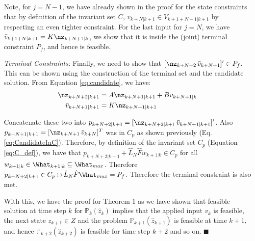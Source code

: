 Note,  for $j=N-1$, we have already shown in the proof for the state constraints that by definition of the invariant set $C$, $v_{k+N|k+1} \in {V}_{k+1+N-1|k+1}$ by respecting an even tighter constraint.
For the last input for $j=N$, we have $\bar{v}_{k+1+N|k+1}=K\nz_{k+N+1|k}$, we show that it is inside the (joint) terminal constraint $P_f$, and hence is feasible.

\textit{Terminal Constraints:} Finally, we need to show that $[\nz_{k+N+2} \, \bar{v}_{k+N+1}]' \in P_f$. This can be shown using the construction of the terminal set and the candidate solution. From Equation \ref{eq:candidate}, we have:
\begin{subequations}
\begin{align}
\nz_{k+N+2|k+1}&=A\nz_{k+N+1|k+1} + B\bar{v}_{k+N+1|k} \\
\bar{v}_{k+N+1|k+1}&=K\nz_{k+N+1|k+1}
\end{align}
\end{subequations}

Concatenate these two into $p_{k+N+2|k+1} = [\nz_{k+N+2|k+1}\, \bar{v}_{k+N+1|k+1}]'$. Also $p_{k+N+1|k+1} = [\nz_{k+N+1} \,\bar{v}_{k+N}]^T$ was in $C_p$ as shown previously (Eq. \ref{eq:CandidateInC}). 
Therefore, by definition of the invariant set $C_p$ (Equation \ref{eq:C_def}), we have that $p_{k+N+2|k+1} + \hat{L}_N \hat{F} w_{k+1|k}\in C_p$ for all $w_{k+1|k}\in \What_{k+1|k} \subseteq \What_{max}$. 
Therefore $p_{k+N+2|k+1} \in C_p \ominus \hat{L}_N\hat{F}\What_{max} = P_f$. 
Therefore the terminal constraint is also met.

With this, we have the proof for Theorem 1 as we have shown that feasible solution at time step $k$ for $\mathbb{P}_{k}(\hat{z}_{k}) $ implies that the applied input $v_k$ is feasible, the next state $z_{k+1} \in Z$ and the problem $\mathbb{P}_{k+1}(\hat{z}_{k+1}) $ is feasible at time $k+1$, and hence  $\mathbb{P}_{k+2}(\hat{z}_{k+2}) $ is feasible for time step $k+2$ and so on. $\blacksquare$






